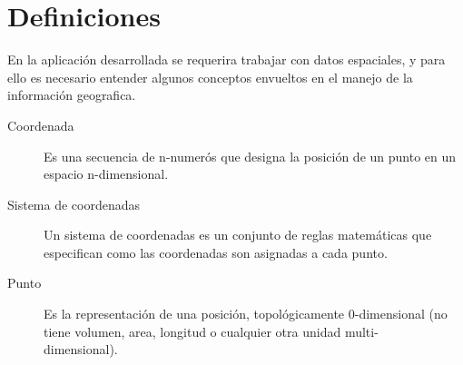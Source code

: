   \section{Definiciones} %
  \label{sec:definiciones}

    En la aplicaci\'on desarrollada se requerira trabajar con datos espaciales, y para ello es necesario entender algunos conceptos envueltos en el manejo de la informaci\'on geografica.

    \begin{description}
      \item[Coordenada] Es una secuencia de n-numer\'os que designa la posici\'on de un punto en un espacio n-dimensional. \\
      \item[Sistema de coordenadas] Un sistema de coordenadas es  un conjunto de reglas matemáticas que especifican como las coordenadas son asignadas  a cada  punto.
      \item[Punto] Es  la representaci\'on de una posici\'on, topol\'ogicamente 0-dimensional (no tiene volumen, area, longitud o cualquier otra unidad multi-\\dimensional).
    \end{description}





